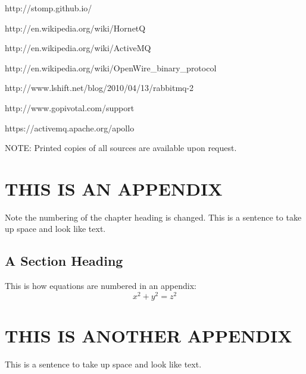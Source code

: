 \documentclass{thesis}
\begin{document}
\begin{singlespace}
\begin{thebibliography}{99}
 http://stomp.github.io/

 http://en.wikipedia.org/wiki/HornetQ

 http://en.wikipedia.org/wiki/ActiveMQ

 http://en.wikipedia.org/wiki/OpenWire_binary_protocol

 http://www.lshift.net/blog/2010/04/13/rabbitmq-2

 http://www.gopivotal.com/support 

 https://activemq.apache.org/apollo




NOTE: Printed copies of all sources are available upon request. 

\end{thebibliography}
\end{singlespace}


\appendix    %
\chapter{THIS IS AN APPENDIX}
Note the numbering of the chapter heading is changed.
This is a sentence to take up space and look like text.
\section{A Section Heading}
This is how equations are numbered in an appendix:
\begin{equation}
x^2 + y^2 = z^2
\end{equation} 

\chapter{THIS IS ANOTHER APPENDIX}
This is a sentence to take up space and look like text.
\end{document}
